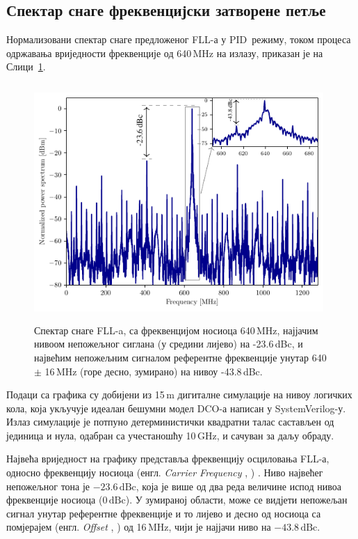 \documentclass[master]{finthesis}
\makeatletter
\newcommand*{\engl}[2][\@empty]{%
    \edef\theacronym{#1}%
    (енгл. \foreignlanguage{english}{\emph{#2}%
    \ifx\theacronym\@empty \else , #1\fi})%
}
\def \FLL  {FLL} %
\def \DCO  {DCO} %
\def \PID  {PID} %
\makeatother
\begin{document}
\subsection{Спектар снаге фреквенцијски затворене петље}
Нормализовани спектар снаге предложеног \FLL-а у \PID\ режиму, током процеса одржавања вриједности фреквенције од 640\,MHz на излазу, приказан је на Слици~\ref{FLL_spectrum}.
\begin{figure}[!ht]
    \centering
    \includegraphics[scale=1, width=11cm, height=9cm]{slike/fll_spectrum_ppt.pdf}
    \caption{Спектар снаге \FLL-a, са фреквенцијом носиоца 640\,MHz, најјачим нивоом непожељног сиглана (у средини лијево) на -23.6\,dBc, и највећим непожељним сигналом референтне фреквенције унутар 640 $\pm$ 16\,MHz (горе десно, зумирано) на нивоу -43.8\,dBc.}
    \label{FLL_spectrum}
\end{figure}
Подаци са графика су добијени из 15\,\textmu m дигиталне симулације на нивоу логичких кола, која укључује идеалан бешумни модел \DCO-а написан у SystemVerilog-у. Излаз симулације је потпуно детерминистички квадратни талас састављен од јединица и нула, одабран са учестаношћу 10\,GHz, и сачуван за даљу обраду.\par
Највећа вриједност на графику представља фреквенцију осциловања \FLL-а, односно фреквенцију носиоца \engl{Carrier Frequency}. Ниво највећег непожељног тона је $-23.6\,\text{dBc}$, која је више од два реда величине испод нивоа фреквенције носиоца ($0\,\text{dBc}$). У зумираној области, може се видјети непожељан сигнал унутар референтне фреквенције и то лијево и десно од носиоца са помјерајем \engl{Offset} од 16\,MHz, чији је најјачи ниво на $-43.8\,\text{dBc}$.
\end{document}
